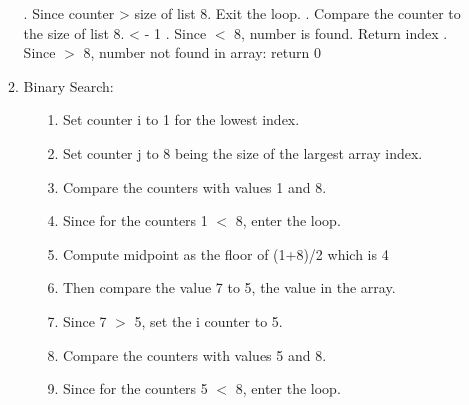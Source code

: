 \documentclass[fleqn]{article}
\begin{document}
\begin{enumerate}
\begin{enumerate}
    	. Since counter  > size of list 8. Exit the loop.
		\newline    	
    	. Compare the counter  to the size of list 8.
    	\newline
    	\ifnum \the\value{i} < \length - 1		
    		. Since  $<$ 8, number is found. Return index \the\value{i} 
    	\else
    		. Since  $>$ 8, number not found in array: return 0
    	\fi
	\delarray\Values
    \item %
   		Binary Search: 	
  			\begin{enumerate}
  				\item[1.]
  				Set counter i to 1 for the lowest index.
  				\item[2.]
  				Set counter j to 8 being the size of the largest array index.
  				\item[3.]
  				Compare the counters with values 1 and 8.
  				\item[4.]
  				Since for the counters 1 $<$ 8, enter the loop.
  				\item[5.]
  				Compute midpoint as the floor of (1+8)/2 which is 4
  				\item[6.]
  				Then compare the value 7 to 5, the value in the array.
  				\item[7.]
  				Since 7 $>$ 5, set the i counter to 5.
  				\item[8.]
  				Compare the counters with values 5 and 8.
  				\item[9.]
  				Since for the counters 5 $<$ 8, enter the loop.

\end{enumerate}
\end{enumerate}
\end{enumerate}
\end{document}
